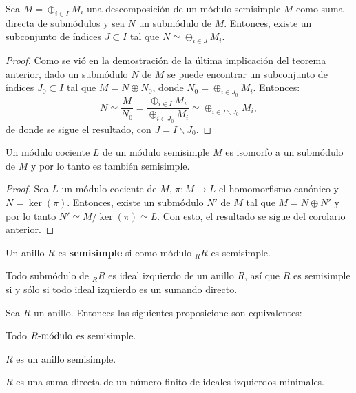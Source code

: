 \begin{corolario}
Sea $M = \oplus_{i \in I}M_i$ una descomposición de un módulo semisimple $M$ como suma directa de submódulos y sea $N$ un submódulo de $M$. Entonces, existe un subconjunto de índices $J \subset I $ tal que $N \simeq \oplus_{i \in J}M_i$.
\end{corolario}
\begin{proof}
Como se vió en la demostración de la última implicación del teorema anterior, dado un submódulo $N$ de $M$ se puede encontrar un subconjunto de índices $J_0 \subset I$  tal que $M = N \oplus N_0$, donde $N_0 = \oplus_{i \in J_0}M_i$. Entonces:
\[ N \simeq \frac{M}{N_0} = \frac{\oplus_{i \in I}M_i}{\oplus_{i \in J_0}M_i} \simeq \oplus_{i \in I \backslash J_0} M_i, \] de donde se sigue el resultado, con $J = I \backslash J_0$.
\end{proof}
\begin{corolario}
Un módulo cociente $L$ de un módulo semisimple $M$ es isomorfo a un submódulo de $M$ y por lo tanto es también semisimple.
\end{corolario}
\begin{proof}
Sea $L$ un módulo cociente de $M$, $\pi \colon M \to L$ el homomorfismo canónico y $N = \ker(\pi)$. Entonces, existe un submódulo $N'$ de $M$ tal que $M = N \oplus N'$ y por lo tanto $N'\simeq M/\ker(\pi) \simeq L$. Con esto, el resultado se sigue del corolario anterior.
\end{proof}
\begin{definicion}
Un anillo $R$ es \textbf{semisimple} si como módulo $_RR$ es semisimple. 
\end{definicion}
Todo submódulo de $_RR$ es ideal izquierdo de un anillo $R$, así que $R$ es semisimple si y sólo si todo ideal izquierdo es un sumando directo.
\begin{teorema}
Sea $R$ un anillo. Entonces las siguientes proposicione son equivalentes:
\begin{bulletList}
\item\label{item:rssimple1} Todo $\modulo{R}$ es semisimple.
\item\label{item:rssimple2} $R$ es un anillo semisimple.
\item\label{item:rssimple3} $R$ es una suma directa de un número finito de ideales izquierdos minimales.
\end{bulletList}
\end{teorema}
